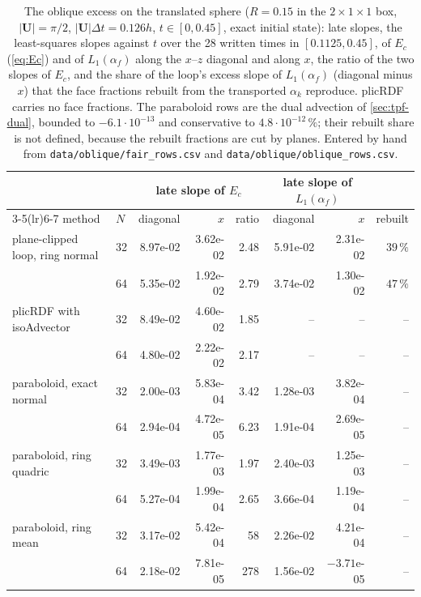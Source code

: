 \documentclass[preprint,12pt]{elsarticle}
\begin{document}
\begin{table}[htbp]
\centering
\caption{The oblique excess on the translated sphere ($R = 0.15$ in the $2 \times 1 \times 1$ box, $|\mathbf{U}| = \pi/2$, $|\mathbf{U}|\Delta t = 0.126h$, $t \in [0, 0.45]$, exact initial state): late slopes, the least-squares slopes against $t$ over the 28 written times in $[0.1125, 0.45]$, of $E_c$ (\cref{eq:Ec}) and of $L_1(\alpha_f)$ along the $x$--$z$ diagonal and along $x$, the ratio of the two slopes of $E_c$, and the share of the loop's excess slope of $L_1(\alpha_f)$ (diagonal minus $x$) that the face fractions rebuilt from the transported $\alpha_k$ reproduce. plicRDF carries no face fractions. The paraboloid rows are the dual advection of \cref{sec:tpf-dual}, bounded to $-6.1\cdot10^{-13}$ and conservative to $4.8\cdot10^{-12}\,\%$; their rebuilt share is not defined, because the rebuilt fractions are cut by planes. Entered by hand from \texttt{data/oblique/fair\_rows.csv} and \texttt{data/oblique/oblique\_rows.csv}.}
\label{tab:tpf-oblique}
\footnotesize
\setlength{\tabcolsep}{4pt}
\begin{tabular}{llrrrrrr}
\toprule
 & & \multicolumn{3}{c}{late slope of $E_c$} & \multicolumn{2}{c}{late slope of $L_1(\alpha_f)$} & \\
\cmidrule(lr){3-5}\cmidrule(lr){6-7}
method & $N$ & diagonal & $x$ & ratio & diagonal & $x$ & rebuilt \\
\midrule
plane-clipped loop, ring normal & 32 & 8.97e-02 & 3.62e-02 & 2.48 & 5.91e-02 & 2.31e-02 & $39\,\%$ \\
 & 64 & 5.35e-02 & 1.92e-02 & 2.79 & 3.74e-02 & 1.30e-02 & $47\,\%$ \\
plicRDF with isoAdvector & 32 & 8.49e-02 & 4.60e-02 & 1.85 & -- & -- & -- \\
 & 64 & 4.80e-02 & 2.22e-02 & 2.17 & -- & -- & -- \\
\midrule
paraboloid, exact normal & 32 & 2.00e-03 & 5.83e-04 & 3.42 & 1.28e-03 & 3.82e-04 & -- \\
 & 64 & 2.94e-04 & 4.72e-05 & 6.23 & 1.91e-04 & 2.69e-05 & -- \\
paraboloid, ring quadric & 32 & 3.49e-03 & 1.77e-03 & 1.97 & 2.40e-03 & 1.25e-03 & -- \\
 & 64 & 5.27e-04 & 1.99e-04 & 2.65 & 3.66e-04 & 1.19e-04 & -- \\
paraboloid, ring mean & 32 & 3.17e-02 & 5.42e-04 & 58 & 2.26e-02 & 4.21e-04 & -- \\
 & 64 & 2.18e-02 & 7.81e-05 & 278 & 1.56e-02 & $-3.71$e-05 & -- \\
\bottomrule
\end{tabular}
\end{table}
\end{document}
